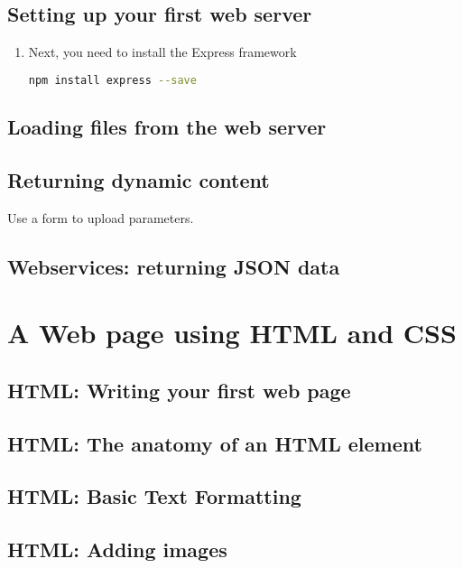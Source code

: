 \documentclass[12pt]{book}
\begin{document}
\chapter{Setting up your first web server}

\begin{enumerate}
\item Next, you need to install the Express framework

\begin{lstlisting}[language=bash]
    npm install express --save
\end{lstlisting}

\end{enumerate}

\chapter{Loading files from the web server}

\chapter{Returning dynamic content}

Use a form to upload parameters.

\chapter{Webservices: returning JSON data}

\part{A Web page using HTML and CSS}

\chapter{HTML: Writing your first web page}

\chapter{HTML: The anatomy of an HTML element}

\chapter{HTML: Basic Text Formatting}

\chapter{HTML: Adding images}
\end{document}
